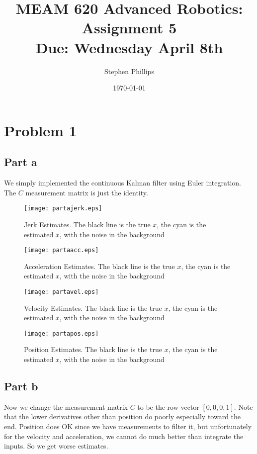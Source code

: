 \documentclass[11pt,english]{article}
\title{MEAM 620 Advanced Robotics: Assignment 5\\
Due:  Wednesday April 8th}
\author{Stephen Phillips}
\date{\today}
\begin{document}
\maketitle

\section*{Problem 1}
\subsection{Part a}
We simply implemented the continuous Kalman filter using Euler integration. The $C$ measurement
matrix is just the identity.

\begin{figure}[H]
  \centering
  \texttt{[image: partajerk.eps]}
  \caption{Jerk Estimates. The black line is the true $x$, the cyan is the estimated $x$, with the noise in the background}
\end{figure}

\begin{figure}[H]
  \centering
  \texttt{[image: partaacc.eps]}
  \caption{Acceleration Estimates. The black line is the true $x$, the cyan is the estimated $x$, with the noise in the background}
\end{figure}

\begin{figure}[H]
  \centering
  \texttt{[image: partavel.eps]}
  \caption{Velocity Estimates. The black line is the true $x$, the cyan is the estimated $x$, with the noise in the background}
\end{figure}

\begin{figure}[H]
  \centering
  \texttt{[image: partapos.eps]}
  \caption{Position Estimates. The black line is the true $x$, the cyan is the estimated $x$, with the noise in the background}
\end{figure}

\subsection{Part b}
Now we change the measurement matrix $C$ to be the row vector $[0,0,0,1]$. Note that the lower derivatives other
than position do poorly especially toward the end. Position does OK since we have measurements to filter it,
but unfortunately for the velocity and acceleration, we cannot do much better than integrate the inputs. So we
get worse estimates.
\end{document}
